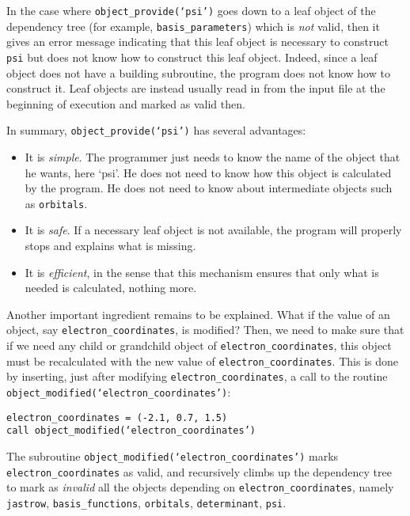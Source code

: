 \documentclass[a4paper,11pt]{article}
\begin{document}
In the case where {\tt object_provide(`psi')} goes down to a leaf object of the dependency tree (for example, {\tt basis_parameters}) which is {\it not} valid, then it gives an error message indicating that this leaf object is necessary to construct {\tt psi} but does not know how to construct this leaf object. Indeed, since a leaf object does not have a building subroutine, the program does not know how to construct it. Leaf objects are instead usually read in from the input file at the beginning of execution and marked as valid then.

\vspace{0.5cm}
In summary, {\tt object_provide(`psi')} has several advantages:
\begin{itemize}
\item It is {\it simple}. The programmer just needs to know the name of the object that he wants, here `psi'. He does not need to know how this object is calculated by the program. He does not need to know about intermediate objects such as {\tt orbitals}.
\item It is {\it safe}. If a necessary leaf object is not available, the program will properly stops and explains what is missing.
\item It is {\it efficient}, in the sense that this mechanism ensures that only what is needed is calculated, nothing more.
\end{itemize}


Another important ingredient remains to be explained. What if the value of an object, say {\tt electron_coordinates}, is modified? Then, we need to make sure that if we need any child or grandchild object of {\tt electron_coordinates}, this object must be recalculated with the new value of {\tt electron_coordinates}. This is done by inserting, just after modifying {\tt electron_coordinates}, a call to the routine {\tt object_modified(`electron_coordinates')}:

\vspace{0.5cm}
\noindent
{\tt electron_coordinates = (-2.1, 0.7, 1.5)\\
call object_modified(`electron_coordinates')
}

\vspace{0.5cm}
The subroutine {\tt object_modified(`electron_coordinates')} marks {\tt electron_coordinates} as valid, and recursively climbs up the dependency tree to mark as {\it invalid} all the objects depending on {\tt electron_coordinates}, namely {\tt jastrow},  {\tt basis_functions}, {\tt orbitals}, {\tt determinant}, {\tt psi}. 
\end{document}
